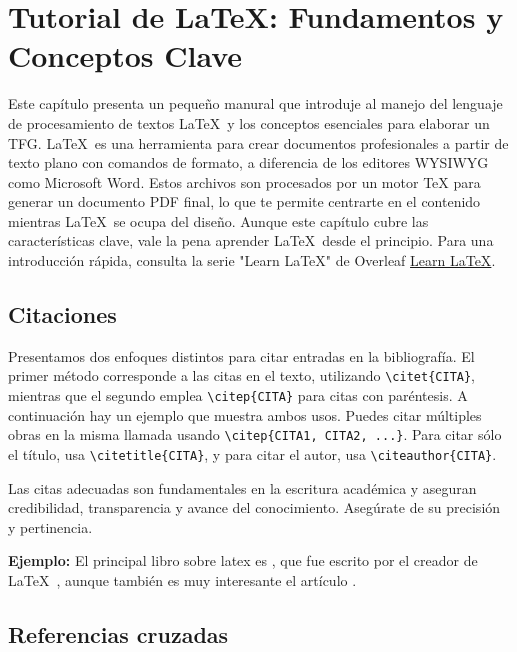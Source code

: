 
\chapter[Tutorial de \LaTeX]{Tutorial de \LaTeX: Fundamentos y Conceptos Clave}
\label{cp:latex-tutorial}

Este capítulo presenta un pequeño manural que introduje al manejo del lenguaje de procesamiento de textos \LaTeX~y los conceptos esenciales para elaborar un TFG. \LaTeX~es una herramienta para crear documentos profesionales a partir de texto plano con comandos de formato, a diferencia de los editores WYSIWYG como Microsoft Word. Estos archivos son procesados por un motor TeX para generar un documento PDF final, lo que te permite centrarte en el contenido mientras \LaTeX~se ocupa del diseño. Aunque este capítulo cubre las características clave, vale la pena aprender \LaTeX~desde el principio. Para una introducción rápida, consulta la serie "Learn LaTeX" de Overleaf \href{https://www.overleaf.com/learn/latex/Learn_LaTeX_in_30_minutes}{Learn LaTeX}.

\section{Citaciones}
\label{sec:citations}

Presentamos dos enfoques distintos para citar entradas en la bibliografía. El primer método corresponde a las citas en el texto, utilizando \verb|\citet{CITA}|, mientras que el segundo emplea \verb|\citep{CITA}| para citas con paréntesis. A continuación hay un ejemplo que muestra ambos usos. Puedes citar múltiples obras en la misma llamada usando \verb|\citep{CITA1, CITA2, ...}|. Para citar sólo el título, usa \verb|\citetitle{CITA}|, y para citar el autor, usa \verb|\citeauthor{CITA}|.

\begin{consejo}
Las citas adecuadas son fundamentales en la escritura académica y aseguran credibilidad, transparencia y avance del conocimiento. Asegúrate de su precisión y pertinencia.
\end{consejo}


\noindent\textbf{Ejemplo:} El principal libro sobre latex es \citet{lamport_latex_1994}, que fue escrito por el creador de \LaTeX~\citeauthor{lamport_latex_1994}, aunque también
es muy interesante el artículo \citep{borbon_latex_2022}.

\section{Referencias cruzadas}

